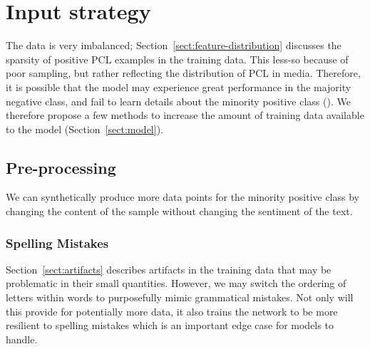 \documentclass[11pt,a4paper]{article}
\begin{document}
\section{Input strategy}



The data is very imbalanced; Section~\ref{sect:feature-distribution} discusses the sparsity of positive PCL examples in the training data. This less-so because of poor sampling, but rather reflecting the distribution of PCL in media. Therefore, it is possible that the model may experience great performance in the majority negative class, and fail to learn details about the minority positive class (\citet{alberto-imbalanced-datasets}). We therefore propose a few methods to increase the amount of training data available to the model (Section~\ref{sect:model}).

\subsection{Pre-processing}

We can synthetically produce more data points for the minority positive class by changing the content of the sample without changing the sentiment of the text. 

\subsubsection{Spelling Mistakes}

Section~\ref{sect:artifacts} describes artifacts in the training data that may be problematic in their small quantities. However, we may switch the ordering of letters within words to purposefully mimic grammatical mistakes. Not only will this provide for potentially more data, it also trains the network to be more resilient to spelling mistakes which is an important edge case for models to handle. 
\end{document}
